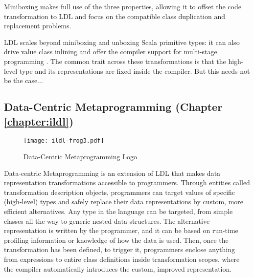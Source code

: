Miniboxing makes full use of the three properties, allowing it to offset the code transformation to LDL and focus on the compatible class duplication and replacement problems.

LDL scales beyond miniboxing and unboxing Scala primitive types: it can also drive value class inlining \cite{gosling-value-classes,rose-value-classes-tearing,rose-value-classes-vm} and offer the compiler support for multi-stage programming \cite{tiark-lms, scala-virtualized}. The common trait across these transformations is that the high-level type and its representations are fixed inside the compiler. But this needs not be the case...

%
%
%
%

\subsection{Data-Centric Metaprogramming (Chapter \ref{chapter:ildl})}

\begin{wrapfigure}{r}{40mm}
  \centering
  \vspace{-2em}
  \texttt{[image: ildl-frog3.pdf]}
  \vspace{-1em}
  \caption{Data-Centric Metaprogramming Logo}
  \vspace{-2em}
\end{wrapfigure}


Data-centric Metaprogramming is an extension of LDL that makes data representation transformations accessible to programmers. Through entities called transformation description objects, programmers can target values of specific (high-level) types and safely replace their data representations by custom, more efficient alternatives. Any type in the language can be targeted, from simple classes all the way to generic nested data structures. The alternative representation is written by the programmer, and it can be based on run-time profiling information or knowledge of how the data is used. Then, once the transformation has been defined, to trigger it,  programmers enclose anything from expressions to entire class definitions inside transformation scopes, where the compiler automatically introduces the custom, improved representation.

